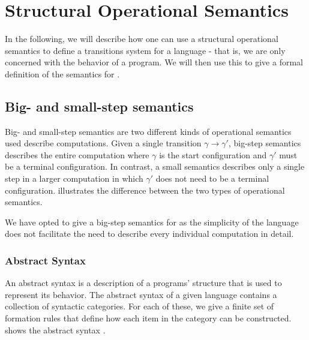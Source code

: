 \section{Structural Operational Semantics}
In the following, we will describe how one can use a structural operational semantics to define a transitions system for a language - that is, we are only concerned with the behavior of a program.
We will then use this to give a formal definition of the semantics for \dazel{}.

\subsection{Big- and small-step semantics}
Big- and small-step semantics are two different kinds of operational semantics used describe computations.
Given a single transition $\gamma \rightarrow \gamma' $, big-step semantics describes the entire computation where $\gamma$ is the start configuration and $\gamma'$ must be a terminal configuration. 
In contrast, a small semantics describes only a single step in a larger computation in which $\gamma'$ does not need to be a terminal configuration. 
 illustrates the difference between the two types of operational semantics\cite{huttelTransitionsTreesIntroduction2010}.


We have opted to give a big-step semantics for \dazel{} as the simplicity of the language does not facilitate the need to describe every individual computation in detail.  
\subsubsection*{Abstract Syntax}
An abstract syntax is a description of a programs' structure that is used to represent its behavior. 
The abstract syntax of a given language contains a collection of syntactic categories. 
For each of these, we give a finite set of formation rules that define how each item in the category can be constructed.
 shows the abstract syntax \dazel{}.


